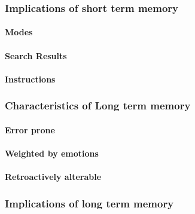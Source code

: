 \documentclass[11pt,]{article}
\let\oldparagraph\paragraph
\renewcommand{\paragraph}[1]{\oldparagraph{#1}\mbox{}}
\begin{document}
\hypertarget{implications-of-short-term-memory}{%
\subsubsection{Implications of short term
memory}\label{implications-of-short-term-memory}}

\hypertarget{modes}{%
\paragraph{Modes}\label{modes}}

\hypertarget{search-results}{%
\paragraph{Search Results}\label{search-results}}

\hypertarget{instructions}{%
\paragraph{Instructions}\label{instructions}}

\hypertarget{characteristics-of-long-term-memory}{%
\subsubsection{Characteristics of Long term
memory}\label{characteristics-of-long-term-memory}}

\hypertarget{error-prone}{%
\paragraph{Error prone}\label{error-prone}}

\hypertarget{weighted-by-emotions}{%
\paragraph{Weighted by emotions}\label{weighted-by-emotions}}

\hypertarget{retroactively-alterable}{%
\paragraph{Retroactively alterable}\label{retroactively-alterable}}

\hypertarget{implications-of-long-term-memory}{%
\subsubsection{Implications of long term
memory}\label{implications-of-long-term-memory}}
\end{document}
